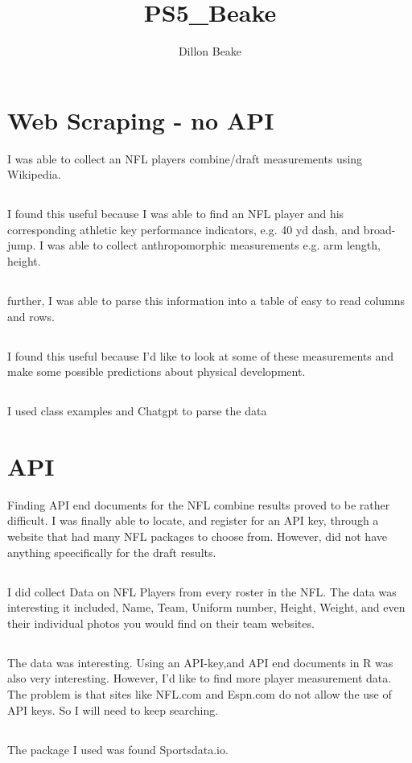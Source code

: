 \documentclass{article}
\title{PS5_Beake}
\author{Dillon Beake}
\begin{document}
\maketitle

\section{Web Scraping - no API}

I was able to collect an NFL players combine/draft measurements using Wikipedia.  
\subsection{}
I found this useful because I was able to find an NFL player and his corresponding athletic key performance indicators, e.g. 40 yd dash, and broad-jump.  I was able to collect anthropomorphic measurements e.g. arm length, height. 
\subsection{}
further, I was able to parse this information into a table of easy to read columns and rows. 
\subsection{}
I found this useful because I'd like to look at some of these measurements and make some possible predictions about physical development.  
\subsection{}
I used class examples and Chatgpt to parse the data

\section{API}
Finding API end documents for the NFL combine results proved to be rather difficult. 
I was finally able to locate, and register for an API key, through a website that had many NFL packages to choose from.  However, did not have anything speecifically for the draft results.   
\subsection{}
I did collect Data on NFL Players from every roster in the NFL.  The data was interesting it included, Name, Team, Uniform number, Height, Weight, and even their individual photos you would find on their team websites.  
\subsection{}
The data was interesting.  Using an API-key,and API end documents in R was also very interesting.   However, I'd like to find more player measurement data.  The problem is that sites like NFL.com and Espn.com do not allow the use of API keys.  So I will need to keep searching.  
\subsection{}
The package I used was found Sportsdata.io. 


\
\end{document}
